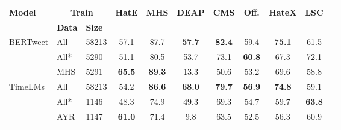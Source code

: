 \begin{table}[ht]
    \centering
    \begin{adjustbox}{width=1\textwidth,center}
    \begin{tabular}{lll|cccccccc}
    \hline
    \multicolumn{1}{l|}{\multirow{2}{*}{\textbf{Model}}} & \multicolumn{2}{c|}{\textbf{Train}} & \multirow{2}{*}{\textbf{HatE}} & \multirow{2}{*}{\textbf{MHS}} & \multirow{2}{*}{\textbf{DEAP}} & \multirow{2}{*}{\textbf{CMS}} & \multirow{2}{*}{\textbf{Off.}} & \multirow{2}{*}{\textbf{HateX}} & \multirow{2}{*}{\textbf{LSC}} \\ \cline{2-3}
    \multicolumn{1}{l|}{}                                & \textbf{Data}       & \textbf{Size}      &                        &                     &                        &                        &                        &                          &                        \\ \hline
    \multicolumn{1}{l|}{\multirow{3}{*}{BERTweet}}    & All         & 58213           & 57.1               & 87.7               & \textbf{57.7}      & \textbf{82.4}         & 59.4                  & \textbf{75.1}          & 61.5                   \\
    \multicolumn{1}{l|}{}                             & All*        & 5290            & 51.1               & 80.5               & 53.7               & 73.1                  & \textbf{60.8}          & 67.3                   & 72.1                   \\
    \multicolumn{1}{l|}{}                             & MHS         & 5291            & \textbf{65.5}      & \textbf{89.3}      & 13.3               & 50.6                  & 53.2                   & 69.6                   & 58.8                   \\ \hline
    \multicolumn{1}{l|}{\multirow{3}{*}{TimeLMs}}     & All         & 58213           & 54.2               & \textbf{86.6}      & \textbf{68.0}      & \textbf{79.7}         & \textbf{56.9}          & \textbf{74.8}          & 59.1                   \\
    \multicolumn{1}{l|}{}                             & All*        & 1146            & 48.3               & 74.9               & 49.3               & 69.3                  & 54.7                   & 59.7                   & \textbf{63.8}          \\
    \multicolumn{1}{l|}{}                             & AYR         & 1147            & \textbf{61.0}      & 71.4               & 9.8                & 63.5                  & 52.5                   & 56.3                   & 60.9                   \\ \hline

\end{tabular}
\end{adjustbox}
\end{table}
